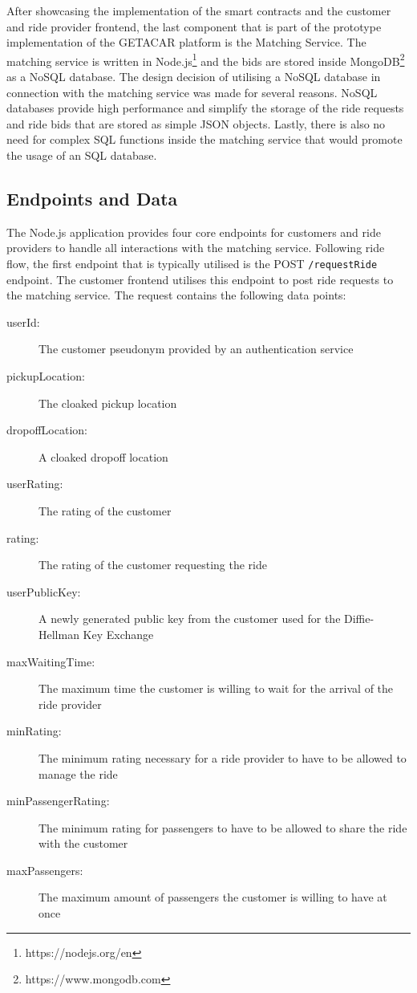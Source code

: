 After showcasing the implementation of the smart contracts and the customer and ride provider frontend, the last component that is part of the prototype implementation of the GETACAR platform is the Matching Service. The matching service is written in Node.js\footnote{https://nodejs.org/en} and the bids are stored inside MongoDB\footnote{https://www.mongodb.com} as a NoSQL database. The design decision of utilising a NoSQL database in connection with the matching service was made for several reasons. NoSQL databases provide high performance and simplify the storage of the ride requests and ride bids that are stored as simple JSON objects. Lastly, there is also no need for complex SQL functions inside the matching service that would promote the usage of an SQL database.


\subsection{Endpoints and Data}
The Node.js application provides four core endpoints for customers and ride providers to handle all interactions with the matching service. Following ride flow, the first endpoint that is typically utilised is the POST \texttt{/requestRide} endpoint. The customer frontend utilises this endpoint to post ride requests to the matching service. The request contains the following data points:

\begin{description}
    \item[userId:] The customer pseudonym provided by an authentication service
    \item[pickupLocation:] The cloaked pickup location
    \item[dropoffLocation:] A cloaked dropoff location
    \item[userRating:] The rating of the customer
    \item[rating:] The rating of the customer requesting the ride
    \item[userPublicKey:] A newly generated public key from the customer used for the Diffie-Hellman Key Exchange
    \item[maxWaitingTime:] The maximum time the customer is willing to wait for the arrival of the ride provider
    \item[minRating:] The minimum rating necessary for a ride provider to have to be allowed to manage the ride
    \item[minPassengerRating:] The minimum rating for passengers to have to be allowed to share the ride with the customer
    \item[maxPassengers:] The maximum amount of passengers the customer is willing to have at once
\end{description}


